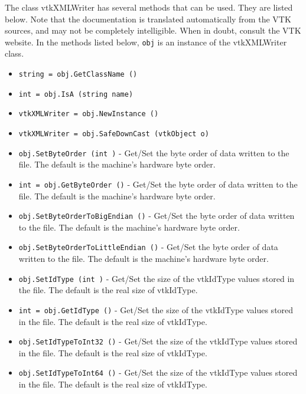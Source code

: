 The class vtkXMLWriter has several methods that can be used.
  They are listed below.
Note that the documentation is translated automatically from the VTK sources,
and may not be completely intelligible.  When in doubt, consult the VTK website.
In the methods listed below, \verb|obj| is an instance of the vtkXMLWriter class.
\begin{itemize}
\item  \verb|string = obj.GetClassName ()|

\item  \verb|int = obj.IsA (string name)|

\item  \verb|vtkXMLWriter = obj.NewInstance ()|

\item  \verb|vtkXMLWriter = obj.SafeDownCast (vtkObject o)|

\item  \verb|obj.SetByteOrder (int )| -  Get/Set the byte order of data written to the file.  The default
 is the machine's hardware byte order.

\item  \verb|int = obj.GetByteOrder ()| -  Get/Set the byte order of data written to the file.  The default
 is the machine's hardware byte order.

\item  \verb|obj.SetByteOrderToBigEndian ()| -  Get/Set the byte order of data written to the file.  The default
 is the machine's hardware byte order.

\item  \verb|obj.SetByteOrderToLittleEndian ()| -  Get/Set the byte order of data written to the file.  The default
 is the machine's hardware byte order.

\item  \verb|obj.SetIdType (int )| -  Get/Set the size of the vtkIdType values stored in the file.  The
 default is the real size of vtkIdType.

\item  \verb|int = obj.GetIdType ()| -  Get/Set the size of the vtkIdType values stored in the file.  The
 default is the real size of vtkIdType.

\item  \verb|obj.SetIdTypeToInt32 ()| -  Get/Set the size of the vtkIdType values stored in the file.  The
 default is the real size of vtkIdType.

\item  \verb|obj.SetIdTypeToInt64 ()| -  Get/Set the size of the vtkIdType values stored in the file.  The
 default is the real size of vtkIdType.


\end{itemize}
